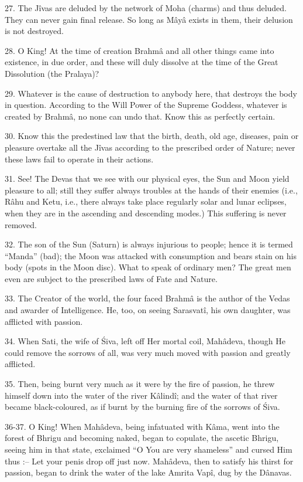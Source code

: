 27. The J\^ivas are deluded by the network of Moha (charms) and thus deluded. They can never gain final release. So long as M\^ay\^a exists in them, their delusion is not destroyed.

28. O King! At the time of creation Brahm\^a and all other things came into existence, in due order, and these will duly dissolve at the time of the Great Dissolution (the Pralaya)?

29. Whatever is the cause of destruction to anybody here, that destroys the body in question. According to the Will Power of the Supreme Goddess, whatever is created by Brahm\^a, no none can undo that. Know this as perfectly certain.

30. Know this the predestined law that the birth, death, old age, diseases, pain or pleasure overtake all the J\^ivas according to the prescribed order of Nature; never these laws fail to operate in their actions.

31. See! The Devas that we see with our physical eyes, the Sun and Moon yield pleasure to all; still they suffer always troubles at the hands of their enemies (i.e., R\^ahu and Ketu, i.e., there always take place regularly solar and lunar eclipses, when they are in the ascending and descending modes.) This suffering is never removed.

32. The son of the Sun (Saturn) is always injurious to people; hence it is termed ``Manda'' (bad); the Moon was attacked with consumption and bears stain on his body (spots in the Moon disc). What to speak of ordinary men? The great men even are subject to the prescribed laws of Fate and Nature.

33. The Creator of the world, the four faced Brahm\^a is the author of the Vedas and awarder of Intelligence. He, too, on seeing Sarasvat\^i, his own daughter, was afflicted with passion.

34. When Sati, the wife of \'Siva, left off Her mortal coil, Mah\^adeva, though He could remove the sorrows of all, was very much moved with passion and greatly afflicted.

35. Then, being burnt very much as it were by the fire of passion, he threw himself down into the water of the river K\^alind\^i; and the water of that river became black-coloured, as if burnt by the burning fire of the sorrows of \'Siva.

36-37. O King! When Mah\^adeva, being infatuated with K\^ama, went into the forest of Bhrigu and becoming naked, began to copulate, the ascetic Bhrigu, seeing him in that state, exclaimed ``O You are very shameless'' and cursed Him thus :-- Let your penis drop off just now. Mah\^adeva, then to satisfy his thirst for passion, began to drink the water of the lake Amrita Vap\^i, dug by the D\^anavas.

